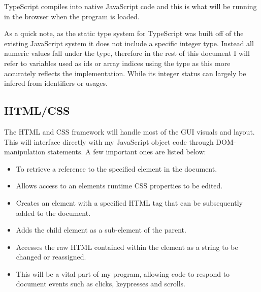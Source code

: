         TypeScript compiles into native JavaScript code and this is what will be running in the browser when the program is loaded.

        As a quick note, as the static type system for TypeScript was built off of the existing JavaScript system it does not include a specific integer type. Instead all numeric values fall under the  type, therefore in the rest of this document I will refer to variables used as ids or array indices using the  type as this more accurately reflects the implementation. While its integer status can largely be infered from identifiers or usages.

    \subsection{HTML/CSS}
    \label{html/css}

        The HTML and CSS framework will handle most of the GUI visuals and layout. This will interface directly with my JavaScript object code through DOM-manipulation statements. A few important ones are listed below:

        \begin{itemize}
            \item {} To retrieve a reference to the specified element in the document.

            \item {} Allows access to an elements runtime CSS properties to be edited.

            \item {} Creates an element with a specified HTML tag that can be subsequently added to the document.

            \item {} Adds the child element as a sub-element of the parent.

            \item {} Accesses the raw HTML contained within the element as a string to be changed or reassigned.

            \item {} This will be a vital part of my program, allowing code to respond to document events such as clicks, keypresses and scrolls.
        \end{itemize}

